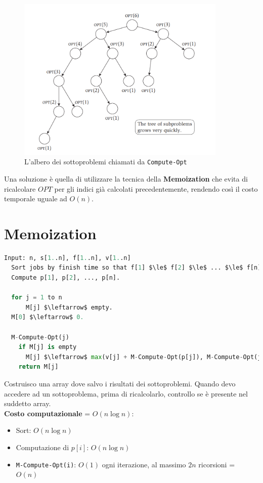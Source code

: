 \begin{figure}[H]
      \centering
      \includegraphics[width=10cm]{capitoli/programmazione_dinamica/imgs/wis_subproblem_tree.png}
      \caption{L'albero dei sottoproblemi chiamati da \texttt{Compute-Opt}}
\end{figure}

Una soluzione è quella di utilizzare la tecnica della
\textbf{Memoization} che evita di ricalcolare $OPT$ per gli indici già
calcolati precedentemente, rendendo così il costo temporale uguale ad
$O(n)$.


\section{Memoization}

\begin{lstlisting}[language=Python, mathescape=true]
  Input: n, s[1..n], f[1..n], v[1..n]
  Sort jobs by finish time so that f[1] $\le$ f[2] $\le$ ... $\le$ f[n]. 
  Compute p[1], p[2], ..., p[n].

  for j = 1 to n 
	  M[j] $\leftarrow$ empty.
  M[0] $\leftarrow$ 0.

  M-Compute-Opt(j)
    if M[j] is empty
  	  M[j] $\leftarrow$ max(v[j] + M-Compute-Opt(p[j]), M-Compute-Opt(j - 1)) 
    return M[j]

\end{lstlisting}

Costruisco una array dove salvo i risultati dei sottoproblemi. Quando
devo accedere ad un sottoproblema, prima di ricalcolarlo, controllo se è
presente nel suddetto array.\\

\textbf{Costo computazionale} = $O(n\log{n})$:

\begin{itemize}
      \item
            Sort: $O(n\log{n})$
      \item
            Computazione di $p[i]$: $O(n\log{n})$
      \item
            \texttt{M-Compute-Opt(i)}: $O(1)$ ogni iterazione, al massimo $2n$
            ricorsioni = $O(n)$
\end{itemize}

